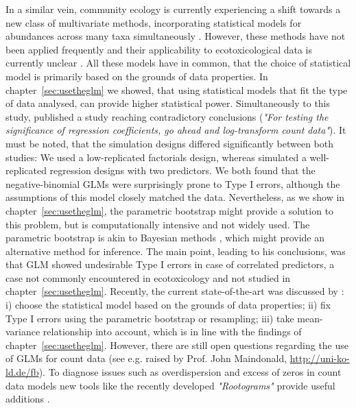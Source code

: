 In a similar vein, community ecology is currently experiencing a shift towards a new class of multivariate methods, incorporating statistical models for abundances across many taxa simultaneously \citep{warton_model-based_2015, warton_distance-based_2012, warton_so_2015, ter_braak_topics_2014}.
However, these methods have not been applied frequently and their applicability to ecotoxicological data is currently unclear \citep{szocs_analysing_2015}. 
All these models have in common, that the choice of statistical model is primarily based on the grounds of data properties. 
In chapter~\ref{sec:usetheglm} we showed, that using statistical models that fit the type of data analysed, can provide higher statistical power.
Simultaneously to this study, \citet{ives_for_2015} published a study reaching contradictory conclusions (\emph{"For testing the significance of regression coefficients, go ahead and log-transform count data"}). 
It must be noted, that the simulation designs differed significantly between both studies: We used a low-replicated factorials design, whereas \citet{ives_for_2015} simulated a well-replicated regression designs with two predictors.
We both found that the negative-binomial GLMs were surprisingly prone to Type I errors, although the assumptions of this model closely matched the data.
Nevertheless, as we show in chapter~\ref{sec:usetheglm}, the parametric bootstrap might provide a solution to this problem, but is computationally intensive and not widely used.
The parametric bootstrap is akin to Bayesian methods \citep{gelman_bayesian_2014}, which might provide an alternative method for inference.
The main point, leading \citet{ives_for_2015} to his conclusions, was that GLM showed undesirable Type I errors in case of correlated predictors, a case not commonly encountered in ecotoxicology and not studied in chapter~\ref{sec:usetheglm}.
Recently, the current state-of-the-art was discussed by \citet{warton_three_2016}: i) choose the statistical model based on the grounds of data properties; ii) fix Type I errors using the parametric bootstrap or resampling; iii) take mean-variance relationship into account, which is in line with the findings of chapter~\ref{sec:usetheglm}.
However, there are still open questions regarding the use of GLMs for count data (see e.g. raised by Prof. John Maindonald, \url{http://uni-ko-ld.de/fb}).
To diagnose issues such as overdispersion and excess of zeros in count data models new tools like the recently developed \emph{"Rootograms"} provide useful additions \citep{kleiber_visualizing_2016}.

